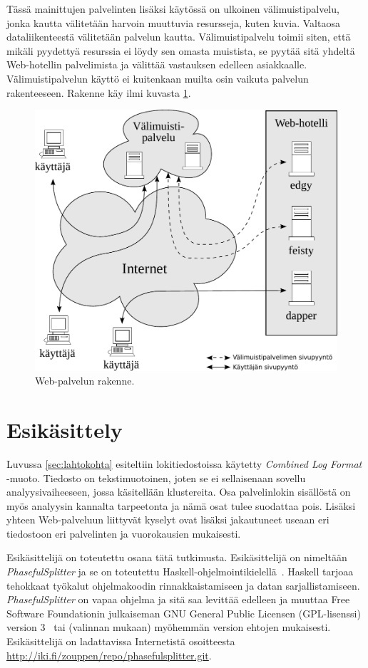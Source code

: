 Tässä mainittujen palvelinten lisäksi käytössä on ulkoinen
välimuistipalvelu, jonka kautta välitetään harvoin muuttuvia
resursseja, kuten kuvia. Valtaosa dataliikenteestä
välitetään palvelun kautta. Välimuistipalvelu toimii siten, että
mikäli pyydettyä resurssia ei löydy sen omasta muistista, se pyytää
sitä yhdeltä Web-hotellin palvelimista ja välittää vastauksen edelleen
asiakkaalle. Välimuistipalvelun käyttö ei kuitenkaan muilta osin
vaikuta palvelun rakenteeseen. Rakenne käy ilmi kuvasta
\ref{palvelinrakenne}.

\begin{figure}[htp]
\centering
\includegraphics[width=12cm]{pics/palvelinrakenne.pdf}
\caption{Web-palvelun rakenne.}
\label{palvelinrakenne}
\end{figure}

\section{Esikäsittely}

Luvussa \ref{sec:lahtokohta} esiteltiin lokitiedostoissa käytetty
\textit{Combined Log Format} -muoto. Tiedosto on tekstimuotoinen,
joten se ei sellaisenaan sovellu analyysivaiheeseen, jossa käsitellään
klustereita. Osa palvelinlokin sisällöstä on myös analyysin kannalta
tarpeetonta ja nämä osat tulee suodattaa pois. Lisäksi yhteen
Web-palveluun liittyvät kyselyt ovat lisäksi jakautuneet useaan eri
tiedostoon eri palvelinten ja vuorokausien mukaisesti.

Esikäsittelijä on toteutettu osana tätä tutkimusta. Esikäsittelijä on
nimeltään \textit{PhasefulSplitter} ja se on toteutettu
Haskell-ohjelmointikielellä~\cite{haskell98}. Haskell tarjoaa
tehokkaat työkalut ohjelmakoodin rinnakkaistamiseen ja datan
sarjallistamiseen. \textit{PhasefulSplitter} on vapaa ohjelma ja sitä saa
levittää edelleen ja muuttaa Free Software Foundationin julkaiseman
GNU General Public Licensen (GPL-lisenssi) version 3~\cite{gplv3} tai (valinnan
mukaan) myöhemmän version ehtojen mukaisesti. Esikäsittelijä on
ladattavissa Internetistä osoitteesta \\
\url{http://iki.fi/zouppen/repo/phasefulsplitter.git}.


